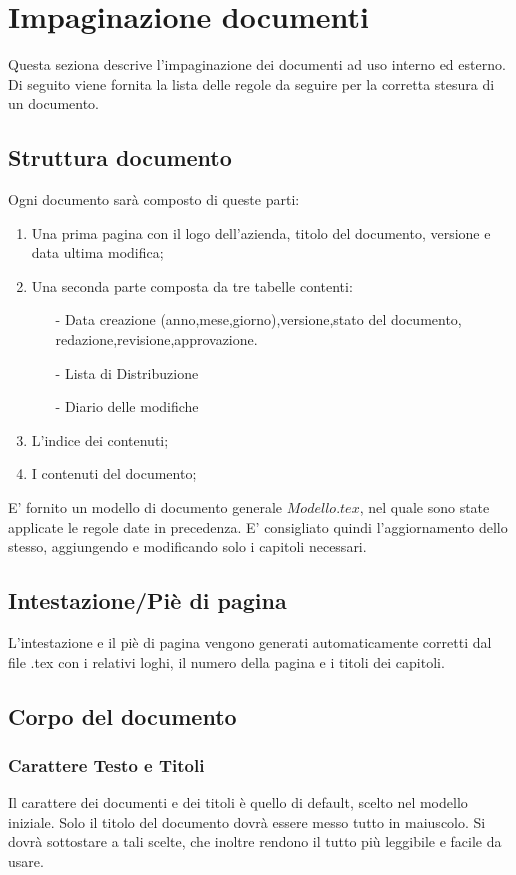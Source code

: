 \documentclass[11pt,titlepage,a4paper]{report}
\begin{document}
\section{Impaginazione documenti}
Questa seziona descrive l'impaginazione dei documenti ad uso interno ed esterno. Di seguito viene fornita la lista delle regole da seguire per la corretta stesura di un documento.
\subsection{Struttura documento}
Ogni documento sar\`a composto di queste parti:
\begin{enumerate}
\item Una prima pagina con il logo dell'azienda, titolo del documento, versione e data ultima modifica;
\item Una seconda parte composta da tre tabelle contenti:
	{\begin{itemize}
	\item[-] Data creazione (anno,mese,giorno),versione,stato del documento, redazione,revisione,approvazione.
	\item[-] Lista di Distribuzione
	\item[-]Diario delle modifiche 
	\end{itemize}}
\item L'indice dei contenuti;
\item I contenuti del documento;
\end{enumerate}
E' fornito un modello di documento generale \( Modello.tex\), nel quale sono state applicate le regole date in precedenza. E' consigliato quindi l'aggiornamento dello stesso, aggiungendo e modificando solo i capitoli necessari.
\subsection{Intestazione/Pi\`e di pagina}
L'intestazione e il pi\`e di pagina vengono generati automaticamente corretti dal file .tex con i relativi loghi, il numero della pagina e i titoli dei capitoli.
\subsection{Corpo del documento}
\subsubsection{Carattere Testo e Titoli}
Il carattere dei documenti e dei titoli \`e quello di default, scelto nel modello iniziale. Solo il titolo del documento dovr\`a essere messo tutto in maiuscolo. Si dovr\`a sottostare a tali scelte, che inoltre rendono il tutto pi\`u leggibile e facile da usare. 
\end{document}
